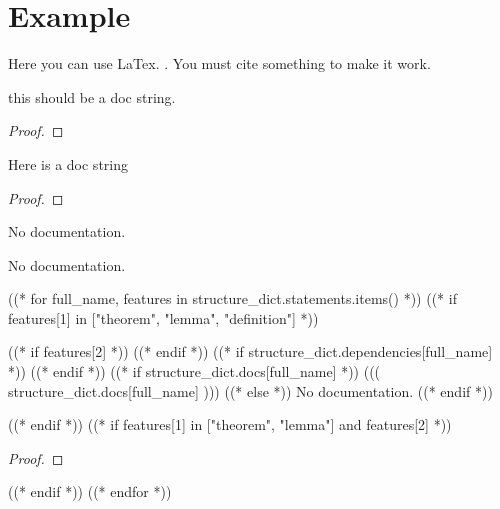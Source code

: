





\section{Example}
Here you can use LaTex. \cite{marcus}. You must cite something to make it work.

%



\begin{lemma}\label{List.aux}
        \leanok
                this should be a doc string.
    \end{lemma}

\begin{proof}
    \leanok
\end{proof}

\begin{theorem}\label{List.Nat.Ex}
        \leanok
                Here is a doc string
    \end{theorem}

\begin{proof}
    \leanok
\end{proof}

\begin{lemma}\label{List.test}
                No documentation.
    \end{lemma}

\begin{theorem}\label{List.Test}
                No documentation.
    \end{theorem}





((* for full_name, features in structure_dict.statements.items() *))
((* if features[1] in ["theorem", "lemma", "definition"] *))
\begin{((( features[1] )))}\label{((( full_name )))}
    ((* if features[2] *))
    \leanok
    ((* endif *))
    ((* if structure_dict.dependencies[full_name] *))
    ((* endif *))
    ((* if structure_dict.docs[full_name] *))
        ((( structure_dict.docs[full_name] )))
    ((* else *))
        No documentation.
    ((* endif *))
\end{((( features[1] )))}

((* endif *))
((* if features[1] in ["theorem", "lemma"] and features[2] *))
\begin{proof}
    \leanok
\end{proof}

((* endif *))
((* endfor *))

